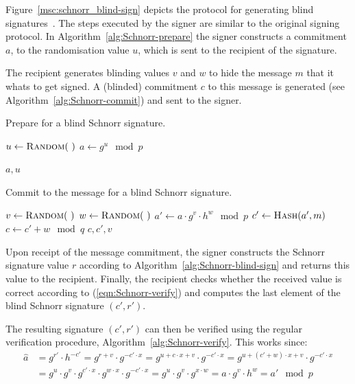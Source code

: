 Figure~\ref{msc:schnorr_blind-sign} depicts the protocol for generating blind
signatures~\cite{PointchevalStern1996}. The steps executed by the signer are
similar to the original signing protocol. In Algorithm~\ref{alg:Schnorr-prepare}
the signer constructs a commitment $a$, to the randomisation value $u$, which is
sent to the recipient of the signature.

The recipient generates blinding values $v$ and $w$ to hide the message $m$ that
it whats to get signed. A (blinded) commitment $c$ to this message is generated
(see Algorithm~\ref{alg:Schnorr-commit}) and sent to the signer.

\begin{algorithm}[H]
  \caption{Prepare for a blind Schnorr signature.}
  \label{alg:Schnorr-prepare}
  \addtolength{\baselineskip}{1mm}
  \begin{algorithmic}[1]
      \State $u \gets \Call{Random}{~}$
      \State $a \gets g^u \mod p$

      \Return $a, u$
    \EndFunction
  \end{algorithmic}
\end{algorithm}

\begin{algorithm}
  \caption{Commit to the message for a blind Schnorr signature.}
  \label{alg:Schnorr-commit}
  \addtolength{\baselineskip}{1mm}
  \begin{algorithmic}[1]
      \State $v \gets \Call{Random}{~}$
      \State $w \gets \Call{Random}{~}$
      \State $a' \gets a \cdot g^v \cdot h^w \mod p$
      \State $c' \gets \Call{Hash}{a', m}$
      \State $c \gets c' + w \mod q$
      \Return $c, c', v$
    \EndFunction
  \end{algorithmic}
\end{algorithm}

Upon receipt of the message commitment, the signer constructs the Schnorr
signature value $r$ according to Algorithm~\ref{alg:Schnorr-blind-sign} and
returns this value to the recipient. Finally, the recipient checks whether the
received value is correct according to (\ref{eqn:Schnorr-verify}) and computes
the last element of the blind Schnorr signature $(c', r')$.

The resulting signature $(c', r')$ can then be verified using the regular
verification procedure, Algorithm~\ref{alg:Schnorr-verify}. This works since:
\begin{align*}
  \hat{a}
  & = g^{r'} \cdot h^{-c'}
  = g^{r + v} \cdot g^{-c' \cdot x}
  = g^{u + c \cdot x + v} \cdot g^{-c' \cdot x}
  = g^{u + (c' + w) \cdot x + v} \cdot g^{-c' \cdot x} \\
  & = g^u \cdot g^v \cdot g^{c' \cdot x} \cdot g^{w \cdot x} \cdot g^{-c' \cdot x}
  = g^u \cdot g^v \cdot g^{x \cdot w}
  = a \cdot g^v \cdot h^w
  = a' \mod p
\end{align*}

